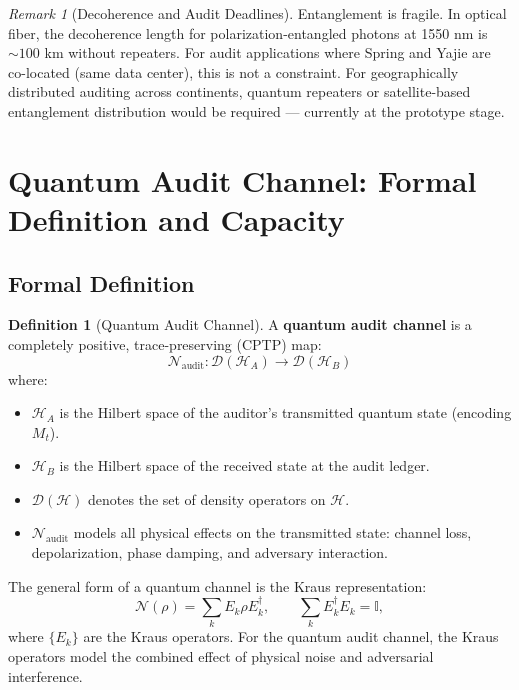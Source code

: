 \documentclass[11pt,a4paper]{article}
\theoremstyle{plain}
\theoremstyle{definition}
\newtheorem{definition}[theorem]{Definition}
\theoremstyle{remark}
\newtheorem{remark}[theorem]{Remark}
\newcommand{\cH}{\mathcal{H}}
\newcommand{\cD}{\mathcal{D}}
\newcommand{\cN}{\mathcal{N}}
\newcommand{\id}{\mathbb{I}}
\newcommand{\Mt}{M_t}
\begin{document}
\begin{remark}[Decoherence and Audit Deadlines]
Entanglement is fragile. In optical fiber, the decoherence length for
polarization-entangled photons at 1550 nm is $\sim 100$ km without repeaters.
For audit applications where Spring and Yajie are co-located (same data center),
this is not a constraint. For geographically distributed auditing across
continents, quantum repeaters or satellite-based entanglement distribution
would be required — currently at the prototype stage.
\end{remark}

\section{Quantum Audit Channel: Formal Definition and Capacity}
\label{sec:channel}

\subsection{Formal Definition}
\label{sec:channel_def}

\begin{definition}[Quantum Audit Channel]
\label{def:qac}
A \textbf{quantum audit channel} is a completely positive, trace-preserving
(CPTP) map:
\[
\cN_{\text{audit}}: \cD(\cH_A) \to \cD(\cH_B)
\]
where:
\begin{itemize}
  \item $\cH_A$ is the Hilbert space of the auditor's transmitted quantum
        state (encoding $\Mt$).
  \item $\cH_B$ is the Hilbert space of the received state at the audit
        ledger.
  \item $\cD(\cH)$ denotes the set of density operators on $\cH$.
  \item $\cN_{\text{audit}}$ models all physical effects on the transmitted
        state: channel loss, depolarization, phase damping, and adversary
        interaction.
\end{itemize}
\end{definition}

The general form of a quantum channel is the Kraus representation:
\[
\cN(\rho) = \sum_{k} E_k \rho E_k^\dagger, \qquad
\sum_k E_k^\dagger E_k = \id,
\]
where $\{E_k\}$ are the Kraus operators. For the quantum audit channel,
the Kraus operators model the combined effect of physical noise and
adversarial interference.
\end{document}
